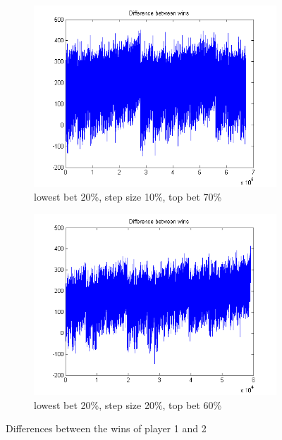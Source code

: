 \documentclass[11pt]{article}
\begin{document}
\begin{figure}[h]
	\centering
	\begin{subfigure}[b]{0.4\textwidth}
		\includegraphics[width=\textwidth]{diff_20_10_70}
		\caption{lowest bet 20\%, step size 10\%, top bet 70\%}
		\label{p1 best strat v2.2}
	\end{subfigure}
	\begin{subfigure}[b]{0.4\textwidth}
		\includegraphics[width=\textwidth]{diff_20_20_60}
		\caption{lowest bet 20\%, step size 20\%, top bet 60\%}
		\label{p1 best strat v2.2}
	\end{subfigure}
	\caption{Differences between the wins of player 1 and 2}
	\label{diff v4}
	
\end{figure}
\end{document}
